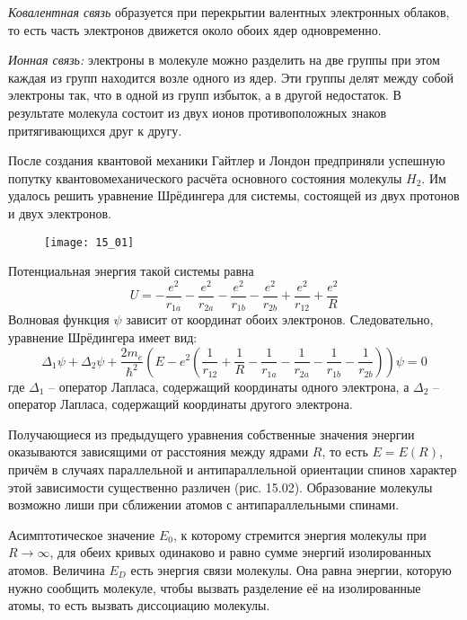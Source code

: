 
\emph{Ковалентная связь} образуется при перекрытии валентных электронных 
облаков, то есть часть электронов движется около обоих ядер одновременно.

\emph{Ионная связь:} электроны в молекуле можно разделить на две группы 
при этом каждая из групп находится возле одного из ядер. Эти группы делят 
между собой электроны так, что в одной из групп избыток, а в другой 
недостаток. В результате молекула состоит из двух ионов противоположных 
знаков притягивающихся друг к другу.

После создания квантовой механики Гайтлер и Лондон предприняли успешную 
попутку квантовомеханического расчёта основного состояния молекулы 
\( H_2 \). Им удалось решить уравнение Шрёдингера для системы, состоящей 
из двух протонов и двух электронов.

\begin{figure}[h!]
    \center
    \texttt{[image: 15\_01]}
\end{figure}

Потенциальная энергия такой системы равна
\[ 
	U = -\frac{e^2}{r_{1a}} - \frac{e^2}{r_{2a}} - \frac{e^2}{r_{1b}} -
	\frac{e^2}{r_{2b}} + \frac{e^2}{r_{12}} + \frac{e^2}{R} 
\]
Волновая функция \( \psi \) зависит от координат обоих электронов. 
Следовательно, уравнение Шрёдингера имеет вид:
\[ 
	\Delta_1\psi + \Delta_2\psi + \frac{2m_e}{\hbar^2}
	\left(E - e^2\left( \frac{1}{r_{12}} + \frac{1}{R} -
	\frac{1}{r_{1a}} - \frac{1}{r_{2a}} - \frac{1}{r_{1b}} -
	\frac{1}{r_{2b}}\right) \right)\psi = 0
\]
где \( \Delta_1 \) -- оператор Лапласа, содержащий координаты 
одного электрона, а \( \Delta_2 \) -- оператор Лапласа, содержащий 
координаты другого электрона.

Получающиеся из предыдущего уравнения собственные значения 
энергии оказываются зависящими от расстояния между ядрами \( R \), 
то есть \( E = E(R) \), причём в случаях параллельной и 
антипараллельной ориентации спинов характер этой зависимости существенно 
различен (рис. 15.02). Образование молекулы возможно лиши при сближении 
атомов с антипараллельными спинами.

Асимптотическое значение \( E_0 \), к которому стремится энергия 
молекулы при \( R \rightarrow \infty \), для обеих кривых одинаково 
и равно сумме энергий изолированных атомов. Величина \( E_D \) есть 
энергия связи молекулы. Она равна энергии, которую нужно сообщить 
молекуле, чтобы вызвать разделение её на изолированные атомы, то есть 
вызвать диссоциацию молекулы.

